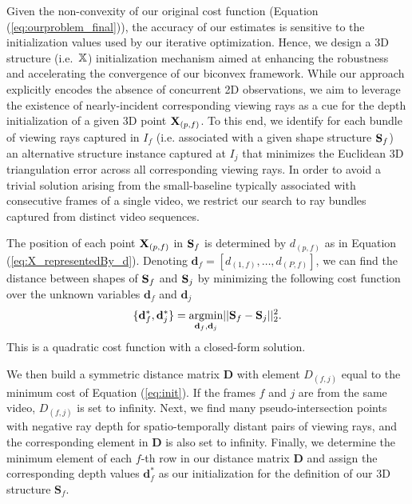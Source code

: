 Given the non-convexity of our original cost function (Equation (\ref{eq:ourproblem_final})), the accuracy of our estimates is  sensitive to the initialization values used by our iterative optimization. 
Hence, we design a 3D structure (i.e.~$\mathbb X$) initialization mechanism aimed at
enhancing the robustness and accelerating the convergence of our biconvex framework.
While our approach explicitly encodes the absence of concurrent 2D observations, we aim to leverage the existence of nearly-incident corresponding viewing rays as a cue for the depth initialization of a given 3D point $\mathbf X_{(p,f)}$.
To this end, we identify for each bundle of viewing rays captured in $I_f$ (i.e. associated with a given shape structure $\mathbf S_f$) an alternative structure instance captured at $I_j$ that minimizes the Euclidean 3D triangulation error across all corresponding viewing rays. In order to avoid a trivial solution arising from the small-baseline typically associated with consecutive frames of a single video, we restrict our search to ray bundles captured from distinct video sequences.

The position of each point $\mathbf X_{(p,f)}$ in $\mathbf S_f$ is determined by $d_{(p,f)}$ as in Equation (\ref{eq:X_representedBy_d}).
Denoting $\mathbf{d}_f = [d_{(1,f)}, \dots, d_{(P,f)} ]$, we can find the  distance between
shapes of $\mathbf S_f$ and $\mathbf S_j$ by minimizing the following cost function over the unknown variables $\mathbf{d}_f$ and $\mathbf{d}_j$
\begin{equation}
\{\mathbf{d}_f^*,\mathbf{d}_j^*\} =  \underset{\mathbf{d}_f,\mathbf{d}_j } {\text{argmin}} ||\mathbf S_f - \mathbf S_j ||_2^2.
\label{eq:init}
\end{equation}
This is a quadratic cost function with a closed-form solution. %

We then build a symmetric distance matrix $\mathbf{D}$ with element $D_{(f,j)}$ equal to the minimum cost of Equation (\ref{eq:init}).
If the frames $f$ and $j$ are from the same video, $D_{(f,j)}$ is set to infinity.
Next, we find many pseudo-intersection points with negative ray depth for spatio-temporally distant pairs of viewing rays, and the corresponding element in $\mathbf{D}$ is also set to infinity.
Finally, we determine the minimum element of each $f$-th row in our distance matrix $\mathbf{D}$ and assign the corresponding depth values $\mathbf d^*_f$ as our initialization for the definition of our 3D structure $\mathbf{S}_f$.

